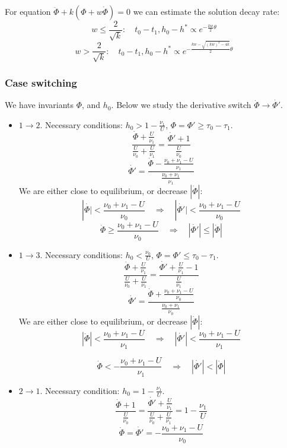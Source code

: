 \documentclass[12pt]{article}
\begin{document}
For equation $\ddot{\Phi} + k (\Phi + w \dot{\Phi}) = 0$ we can estimate the solution decay rate:
$$ w \leq \frac{2}{\sqrt{k}}: \quad t_0 - t_1, h_0 - h^* \propto e^{-\frac{kw}{2} \theta}$$ 
$$w > \frac{2}{\sqrt{k}}: \quad t_0 - t_1, h_0 - h^* \propto e^{-\frac{kw - \sqrt{(kw)^2 - 4k}}{2}\theta}$$

\subsubsection*{Case switching}

We have invariants $\Phi$, and $h_0$. Below we study the derivative switch $ \dot{\Phi} \to \dot{\Phi'} $. 

\begin{itemize}

	\item $1 \to 2$. Necessary conditions: $h_0 > 1 - \frac{\nu_1}{U}$, $\Phi = \Phi' \geq \tau_0 - \tau_1$.
$$ \frac{\dot{\Phi} + \frac{U}{\nu_1}}{\frac{U}{\nu_0} + \frac{U}{\nu_1}} = \frac{\dot{\Phi'} + 1}{\frac{U}{\nu_0}}$$		
$$ \dot{\Phi'} = \frac{\dot{\Phi} - \frac{ \nu_0 + \nu_1 - U }{\nu_1} }{\frac{\nu_0 + \nu_1}{\nu_1}} $$
We are either close to equilibrium, or decrease $|\dot{\Phi}|$:
$$  |\dot{\Phi |} < \frac{\nu_0 + \nu_1 - U}{\nu_0} \quad \Rightarrow \quad  | \dot{\Phi'}| < \frac{\nu_0 + \nu_1 - U}{\nu_0} $$
$$ \dot{\Phi} \geq \frac{\nu_0 + \nu_1 - U}{\nu_0}  \quad \Rightarrow \quad |\dot{\Phi'}| \leq |\dot{\Phi}| $$

	\item $1 \to 3$. Necessary conditions: $h_0 < \frac{\nu_0}{U}$, $\Phi = \Phi' \leq \tau_0 - \tau_1$.
$$  \frac{\dot{\Phi} + \frac{U}{\nu_1}}{\frac{U}{\nu_0} + \frac{U}{\nu_1}} = \frac{\dot{\Phi'} + \frac{U}{\nu_1} - 1}{\frac{U}{\nu_1}} $$
$$ \dot{\Phi'} = \frac{ \dot{\Phi} + \frac{\nu_0 + \nu_1 - U}{\nu_0} }{ \frac{\nu_0 + \nu_1}{\nu_0} } $$
 We are either close to equilibrium, or decrease $|\dot{\Phi}|$:
$$ |\dot{\Phi}| < \frac{\nu_0 + \nu_1 - U}{\nu_1} \quad \Rightarrow \quad |\dot{\Phi'}| < \frac{\nu_0 + \nu_1 - U}{\nu_1}$$

$$ \dot{\Phi} < - \frac{\nu_0 + \nu_1 - U}{\nu_1} \quad \Rightarrow \quad |\dot{\Phi'}| < |\dot{\Phi}|$$

	\item $2 \to 1$. Necessary condition: $h_0 = 1 - \frac{\nu_1}{U}$.
$$     \frac{\dot{\Phi} + 1}{\frac{U}{\nu_0}} = \frac{\dot{\Phi'} + \frac{U}{\nu_1}}{\frac{U}{\nu_0} + \frac{U}{\nu_1}} = 1 - \frac{\nu_1}{U} $$
 $$ \dot{\Phi}= \dot{\Phi'} = - \frac{\nu_0 + \nu_1 - U}{\nu_0}$$


\end{itemize}
\end{document}
